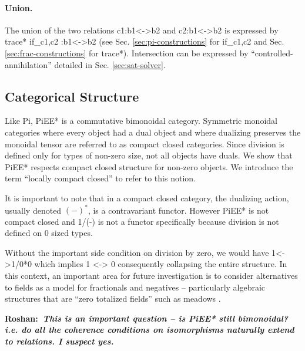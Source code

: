 \documentclass[preprint]{sigplanconf}
\newcommand{\xcomment}[2]{\textbf{#1:~\textsl{#2}}}
\newcommand{\roshan}[1]{\xcomment{Roshan}{#1}}
\newcommand{\asterix}[0]{*}
\begin{document}

\paragraph*{Union.}
The union of the two relations {{c1:b1<->b2}} and {{c2:b1<->b2}} is
expressed by {{trace* if_{c1,c2} :b1<->b2}} (see Sec.
\ref{sec:pi-constructions} for {{if_{c1,c2} }} and
Sec. \ref{sec:frac-constructions} for {{trace*}}). Intersection can be
expressed by ``controlled-annihilation'' detailed in
Sec. \ref{sec:sat-solver}.


\subsection{Categorical Structure}

Like {{Pi}}, {{PiEE*}} is a commutative bimonoidal category.
Symmetric monoidal categories where every object had a dual object and
where dualizing preserves the monoidal tensor are referred to as
compact closed categories. Since division is defined only for types of
non-zero size, not all objects have duals.  We show that {{PiEE*}}
respects compact closed structure for non-zero objects. We introduce
the term ``locally compact closed'' to refer to this notion.

It is important to note that in a compact closed category, the
dualizing action, usually denoted $(-)^\asterix$, is a contravariant
functor. However {{PiEE*}} is not compact closed and {{1/(-)}} is not
a functor specifically because division is not defined on 0 sized
types.

Without the important side condition on division by zero, we would
have {{1<->1/0*0}} which implies {{1 <-> 0}} consequently collapsing
the entire structure. In this context, an important area for future
investigation is to consider alternatives to fields as a model for
fractionals and negatives -- particularly algebraic structures that
are ``zero totalized fields'' such as meadows
\cite{Bergstra:2009:MES:1507774.1508000}.

\roshan{This is an important question -- is {{PiEE*}} still
  bimonoidal? i.e. do all the coherence conditions on isomorphisms
  naturally extend to relations. I suspect yes.}
\end{document}
